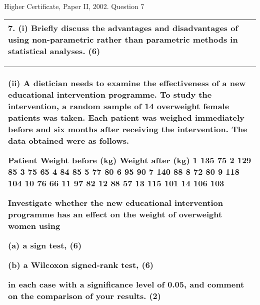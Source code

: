 \documentclass[a4paper,12pt]{article}
\begin{document}
Higher Certificate, Paper II, 2002.  Question 7 
\begin{table}[ht!]
 
\centering
 
\begin{tabular}{|p{15cm}|}
 
\hline  


7. (i) Briefly discuss the advantages and disadvantages of using non-parametric rather than parametric methods in statistical analyses. (6) 

\\ \hline
  
\end{tabular}

\end{table}

\begin{table}[ht!]
 
\centering
 
\begin{tabular}{|p{15cm}|}
 
\hline  
  
 (ii) A dietician needs to examine the effectiveness of a new educational intervention programme.  To study the intervention, a random sample of 14 overweight female patients was taken.  Each patient was weighed immediately before and six months after receiving the intervention.  The data obtained were as follows. 
 
Patient Weight before (kg) Weight after (kg) 1 135   75 2 129   85 3   75   65 4   84   85 5   77   80 6   95   90 7 140   88 8   72   80 9 118 104 10   76   66 11   97   82 12   88   57 13 115 101 14 106 103 
 
 
  Investigate whether the new educational intervention programme has an effect on the weight of overweight women using 
 
  (a) a sign test, 
(6) 
 
  (b) a Wilcoxon signed-rank test, 
(6) 
 
  in each case with a significance level of 0.05, and comment on the comparison of your results. (2) 
 
\\ \hline
  
\end{tabular}

\end{table} 
 
\end{document}
